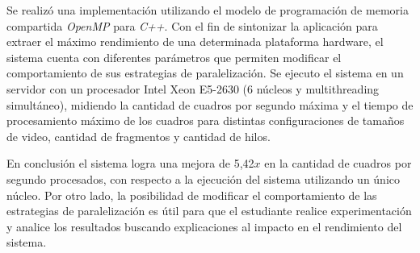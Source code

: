 Se realizó una implementación utilizando el modelo de programación de memoria
compartida \emph{OpenMP} para \emph{C++}. Con el fin de sintonizar la aplicación
para extraer el máximo rendimiento de una determinada plataforma hardware, el
sistema cuenta con diferentes parámetros que permiten modificar el
comportamiento de sus estrategias de paralelización. Se ejecuto el sistema en un
servidor con un procesador Intel Xeon E5-2630 (6 núcleos y multithreading
simultáneo), midiendo la cantidad de cuadros por segundo máxima y el tiempo de
procesamiento máximo de los cuadros para distintas configuraciones de tamaños de
video, cantidad de fragmentos y cantidad de hilos.

En conclusión el sistema logra una mejora de 5,42$x$ en la cantidad de cuadros
por segundo procesados, con respecto a la ejecución del sistema utilizando un
único núcleo. Por otro lado, la posibilidad de modificar el comportamiento de
las estrategias de paralelización es útil para que el estudiante realice
experimentación y analice los resultados buscando explicaciones al impacto en el
rendimiento del sistema.

\vfill
\pagebreak
